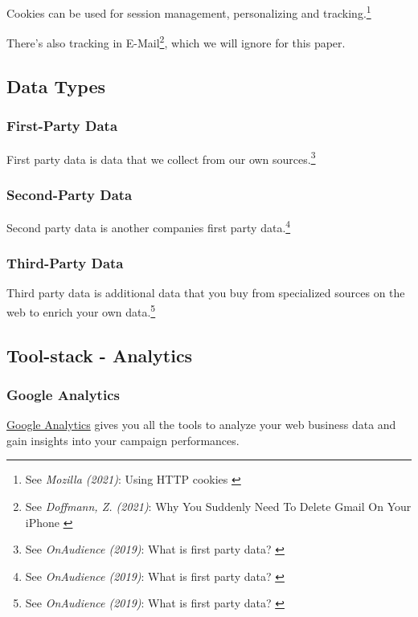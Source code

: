 Cookies can be used for session management, personalizing and tracking.\footnote{See \textit{Mozilla (2021)}: Using HTTP cookies \cite{usingCookies}}

There's also tracking in E-Mail\footnote{See \textit{Doffmann, Z. (2021)}: Why You Suddenly Need To Delete Gmail On Your iPhone \cite{deleteGmail}}, which we will ignore for this paper.

\subsection{Data Types}

\subsubsection{First-Party Data}

First party data is data that we collect from our own sources.\footnote{See \textit{OnAudience (2019)}: What is first party data? \cite{firstParty}}

\subsubsection{Second-Party Data}

Second party data is another companies first party data.\footnote{See \textit{OnAudience (2019)}: What is first party data? \cite{firstParty}}

\subsubsection{Third-Party Data}

Third party data is additional data that you buy from specialized sources on the web to enrich your own data.\footnote{See \textit{OnAudience (2019)}: What is first party data? \cite{firstParty}}

\subsection{Tool-stack - Analytics}

\subsubsection{Google Analytics}

\href{https://analytics.google.com/}{Google Analytics} gives you all the tools to analyze your web business data and gain insights into your campaign performances.


